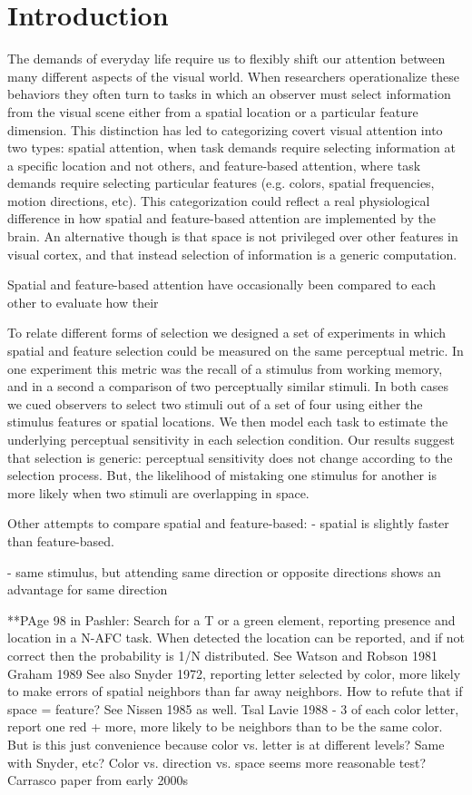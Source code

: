
\section{Introduction}

The demands of everyday life require us to flexibly shift our attention between many different aspects of the visual world. When researchers operationalize these behaviors they often turn to tasks in which an observer must select information from the visual scene either from a spatial location or a particular feature dimension. This distinction has led to categorizing covert visual attention into two types: spatial attention, when task demands require selecting information at a specific location and not others, and feature-based attention, where task demands require selecting particular features (e.g. colors, spatial frequencies, motion directions, etc). This categorization could reflect a real physiological difference in how spatial and feature-based attention are implemented by the brain. An alternative though is that space is not privileged over other features in visual cortex, and that instead selection of information is a generic computation.

Spatial and feature-based attention have occasionally been compared to each other to evaluate how their

To relate different forms of selection we designed a set of experiments in which spatial and feature selection could be measured on the same perceptual metric. In one experiment this metric was the recall of a stimulus from working memory, and in a second a comparison of two perceptually similar stimuli. In both cases we cued observers to select two stimuli out of a set of four using either the stimulus features or spatial locations. We then model each task to estimate the underlying perceptual sensitivity in each selection condition. Our results suggest that selection is generic: perceptual sensitivity does not change according to the selection process. But, the likelihood of mistaking one stimulus for another is more likely when two stimuli are overlapping in space.

Other attempts to compare spatial and feature-based:
\citep{Liu2007-ed} - spatial is slightly faster than feature-based. 

\citep{Saenz2003-qz} - same stimulus, but attending same direction or opposite directions shows an advantage for same direction 


**PAge 98 in Pashler:
Search for a T or a green element, reporting presence and location in a N-AFC task. When detected the location can be reported, and if not correct then the probability is 1/N distributed. 
See Watson and Robson 1981
Graham 1989
See also Snyder 1972, reporting letter selected by color, more likely to make errors of spatial neighbors than far away neighbors. How to refute that if space = feature? See Nissen 1985 as well.
Tsal Lavie 1988 - 3 of each color letter, report one red + more, more likely to be neighbors than to be the same color. But is this just convenience because color vs. letter is at different levels? Same with Snyder, etc? Color vs. direction vs. space seems more reasonable test?
Carrasco paper from early 2000s


